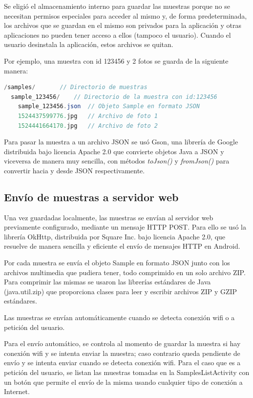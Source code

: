 Se eligió el almacenamiento interno para guardar las muestras porque no se necesitan permisos especiales para acceder al mismo y, de forma predeterminada, los archivos que se guardan en el mismo son privados para la aplicación y otras aplicaciones no pueden tener acceso a ellos (tampoco el usuario). Cuando el usuario desinstala la aplicación, estos archivos se quitan\cite{androidInternalStorage}.

Por ejemplo, una muestra con id 123456 y 2 fotos se guarda de la siguiente manera:
\begin{lstlisting}[language=Java, frame=tlb]
/samples/		// Directorio de muestras
  sample_123456/	// Directorio de la muestra con id:123456 
    sample_123456.json	// Objeto Sample en formato JSON
    1524437599776.jpg	// Archivo de foto 1
    1524441664170.jpg	// Archivo de foto 2
\end{lstlisting}

Para pasar la muestra a un archivo JSON se usó Gson\cite{gson}, una librería de Google distribuida bajo licencia Apache 2.0 que convierte objetos Java a JSON y viceversa de manera muy sencilla, con métodos \textit{toJson()} y \textit{fromJson()} para convertir hacia y desde JSON respectivamente.

\subsection{Envío de muestras a servidor web}

Una vez guardadas localmente, las muestras se envían al servidor web previamente configurado, mediante un mensaje HTTP POST. Para ello se usó la librería OkHttp\cite{okhttp}, distribuida por Square Inc. bajo licencia Apache 2.0, que resuelve de manera sencilla y eficiente el envío de mensajes HTTP en Android.

Por cada muestra se envía el objeto Sample en formato JSON junto con los archivos multimedia que pudiera tener, todo comprimido en un solo archivo ZIP. Para comprimir las mismas se usaron las librerías estándares de Java (java.util.zip) que proporciona clases para leer y escribir archivos ZIP y GZIP estándares.

Las muestras se envían automáticamente cuando se detecta conexión wifi o a petición del usuario.

Para el envío automático, se controla al momento de guardar la muestra si hay conexión wifi y se intenta enviar la muestra; caso contrario queda pendiente de envío y se intenta enviar cuando se detecta conexión wifi. Para el caso que es a petición del usuario, se listan las muestras tomadas en la SamplesListActivity con un botón que permite el envío de la misma usando cualquier tipo de conexión a Internet.

